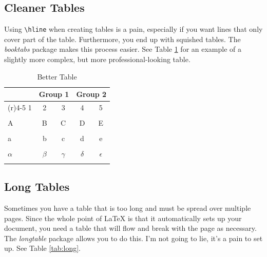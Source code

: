 \documentclass[12pt]{article}
\newcommand{\RR}{\raggedright\arraybackslash} %
\begin{document}
\subsection{Cleaner Tables}
Using \texttt{\textbackslash{}hline} when creating tables is a pain,
especially if you want lines that only cover part of the
table. Furthermore, you end up with squished tables. The
{\itshape booktabs} package makes this process easier. See Table
\ref{tab:bettertable} for an example of a slightly more complex, but
more professional-looking table.

\begin{table}[!h]
\centering
\caption{Better Table}\label{tab:bettertable}
\begin{tabular}{>{\RR}p{2in} c c c c}
\toprule
& \multicolumn{2}{l}{Group 1} & \multicolumn{2}{l}{Group 2} \\
\cmidrule(r){2-3}
\cmidrule(r){4-5}
1 & 2 & 3 & 4 & 5\\
\midrule
\\ %
A & B & C & D & E\\
\\
a & b & c & d & e\\
\\
$\alpha$ & $\beta$ & $\gamma$ & $\delta$ & $\epsilon$ \\
\\
\bottomrule
\end{tabular}
\end{table}

\subsection{Long Tables}
Sometimes you have a table that is too long and must be spread over
multiple pages. Since the whole point of \LaTeX{} is that it
automatically sets up your document, you need a table that will flow
and break with the page as necessary. The {\itshape longtable} package
allows you to do this. I'm not going to lie, it's a pain to set
up. See Table \ref{tab:long}.
\end{document}
